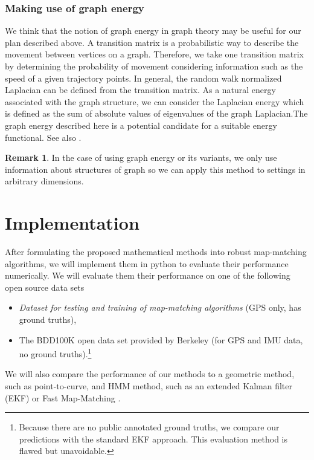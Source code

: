 \documentclass{article}
\numberwithin{equation}{section}
\theoremstyle{definition}
\newtheorem{remark}[remark]{Remark}
\begin{document}
\subsubsection*{Making use of graph energy}
We think that the notion of graph energy in graph theory may be useful for our plan described above.
A transition matrix is a probabilistic way to describe the movement between vertices on a graph. 
Therefore, we take one transition matrix by determining the probability of movement considering information such as the speed of a given trajectory points. 
In general, the random walk normalized Laplacian can be defined from the transition matrix.
As a natural energy associated with the graph structure, we can consider the Laplacian energy which is defined as the sum of absolute values of eigenvalues of the graph Laplacian.The graph energy described here is a potential candidate for a suitable energy functional. 
See also \cite{LSG}.

\begin{remark}
In the case of using graph energy or its variants, we only use information about structures of graph so we can apply this method to settings in arbitrary dimensions.
\end{remark}



\section{Implementation}

After formulating the proposed  mathematical methods into robust map-matching algorithms, we will implement them in python to evaluate their performance numerically. We will evaluate them their performance on one of the following open source data sets
\begin{itemize}
    \item \textit{Dataset for testing and training of map-matching algorithms} \cite{KCMMN} (GPS only, has ground truths),
    \item The BDD100K open data set provided by Berkeley \cite{yuBDD100KDiverseDriving2020} (for GPS and IMU data, no ground truths).\footnote{Because there are no public annotated ground truths, we compare our predictions with the standard EKF approach. This evaluation method is flawed but unavoidable.} %
\end{itemize}
We will also compare the performance of our methods to a geometric method, such as point-to-curve, and HMM method, such as an extended Kalman filter (EKF) or Fast Map-Matching \cite{YG}.
\end{document}

